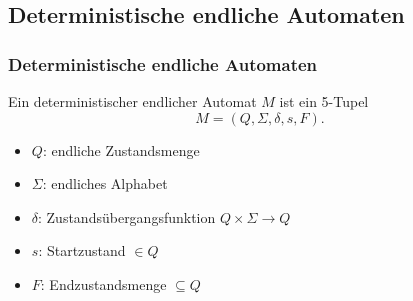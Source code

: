 \subsection{Deterministische endliche Automaten}
\begin{frame}
\frametitle{Deterministische endliche Automaten}
        Ein deterministischer endlicher Automat $M$ ist ein 5-Tupel
        \[
        M= (Q,\Sigma,\delta,s,F).
        \]
        \begin{itemize}
        \item $Q$:  endliche Zustandsmenge
        \item $\Sigma$:    endliches Alphabet
        \item $\delta$:   Zustandsübergangsfunktion $Q\times \Sigma \rightarrow Q$
        \item $s$:   Startzustand $\in Q$
        \item $F$:   Endzustandsmenge $\subseteq Q$
        \end{itemize}
\end{frame}
